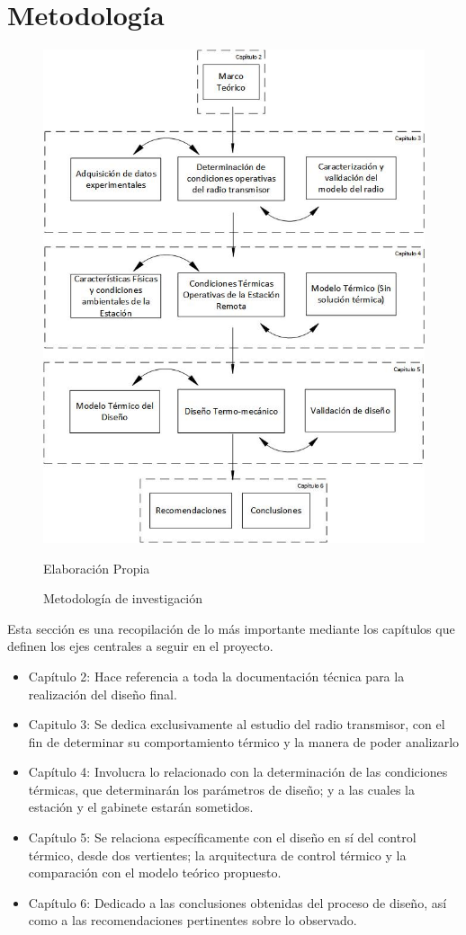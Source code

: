 \section{Metodología}
\begin{figure}[ht]
\centering
\includegraphics[width=0.9\linewidth]{Figuras/Metodologia.jpg}
\caption{Metodología de investigación}
Elaboración Propia
\label{Metodologia}
\end{figure}

Esta sección es una recopilación de lo más importante mediante los capítulos que definen los ejes centrales a seguir en el proyecto.

\begin{itemize}
    \item Capítulo 2: Hace referencia a toda la documentación técnica para la realización del diseño final.
    \item Capitulo 3: Se dedica exclusivamente al estudio del radio transmisor, con el fin de determinar su comportamiento térmico y la manera de poder analizarlo
    \item Capítulo 4: Involucra lo relacionado con la determinación de las condiciones térmicas, que determinarán los parámetros de diseño; y a las cuales la estación y el gabinete estarán sometidos.
    \item Capítulo 5: Se relaciona específicamente con el diseño en sí del control térmico, desde dos vertientes; la arquitectura de control térmico y la comparación con el modelo teórico propuesto.
    \item Capítulo 6: Dedicado a las conclusiones obtenidas del proceso de diseño, así como a las recomendaciones pertinentes sobre lo observado.
\end{itemize}

